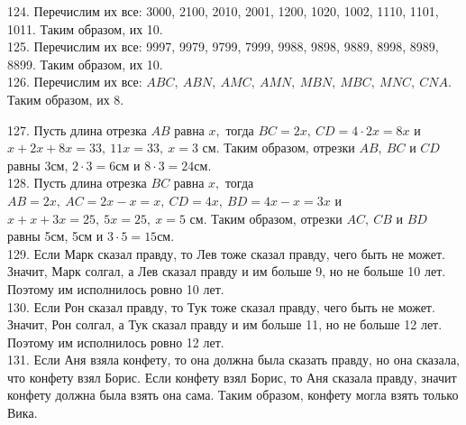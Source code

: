 \documentclass[12pt]{article}
\begin{document}
124. Перечислим их все: 3000, 2100, 2010, 2001, 1200, 1020, 1002, 1110, 1101, 1011. Таким образом, их 10.\\
125. Перечислим их все: 9997, 9979, 9799, 7999, 9988, 9898, 9889, 8998, 8989, 8899. Таким образом, их 10.\\
126. Перечислим их все: $ABC,\ ABN,\ AMC,\ AMN,\ MBN,\ MBC,\ MNC,\ CNA.$ Таким образом, их 8.
\begin{center}
\begin{figure}[ht!]
\end{figure}
\end{center}
127.  Пусть длина отрезка $AB$ равна $x,$ тогда $BC=2x,\ CD=4\cdot2x=8x$ и $x+2x+8x=33,\ 11x=33,\ x=3$ см. Таким образом, отрезки $AB,\ BC$ и $CD$ равны 3см, $2\cdot3=6$см и $8\cdot3=24$см.\\
128. Пусть длина отрезка $BC$ равна $x,$ тогда $AB=2x,\ AC=2x-x=x,\ CD=4x,\ BD=4x-x=3x$ и $x+x+3x=25,\ 5x=25,\ x=5$ см. Таким образом, отрезки $AC,\ CB$ и $BD$ равны 5см, 5см и $3\cdot5=15$см.\\
129. Если Марк сказал правду, то Лев тоже сказал правду, чего быть не может. Значит, Марк солгал, а Лев сказал правду и им больше 9, но не больше 10 лет. Поэтому им исполнилось ровно 10 лет.\\
130. Если Рон сказал правду, то Тук тоже сказал правду, чего быть не может. Значит, Рон солгал, а Тук сказал правду и им больше 11, но не больше 12 лет. Поэтому им исполнилось ровно 12 лет.\\
131. Если Аня взяла конфету, то она должна была сказать правду, но она сказала, что конфету взял Борис. Если конфету взял Борис, то Аня сказала правду, значит конфету должна была взять она сама. Таким образом, конфету могла взять только Вика.\\
\end{document}
